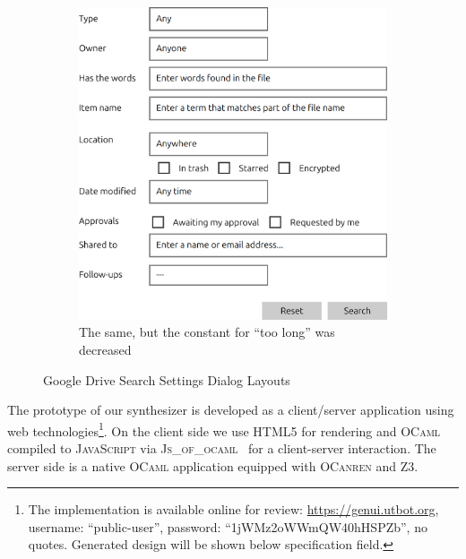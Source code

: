\begin{figure}[t]
\begin{subfigure}[t]{.45\textwidth}
    \end{subfigure}\hspace{1cm}
    \begin{subfigure}[t]{.45\textwidth}
      \centering
      \includegraphics[scale=0.25]{google-drive-search-setting-output3.png}
      \caption{The same, but the constant for ``too long'' was decreased}
    \end{subfigure}
    \caption{Google Drive Search Settings Dialog Layouts}
    \label{fig:QMLtwoGuidelines}
\end{figure}

\newcommand{\OCaml}{\textsc{OCaml}\xspace}
\newcommand{\OCanren}{\textsc{OCanren}\xspace}
\newcommand{\noCanren}{\textsc{noCanren}\xspace}
\newcommand{\Zthree}{\textsc{Z3}\xspace}
\newcommand{\JSOO}{\textsc{Js\_of\_ocaml}\xspace}


The prototype of our synthesizer is developed as a \mbox{client}/server application using web technologies\footnote{The implementation is available online
for review: \url{https://genui.utbot.org}, username: ``public-user'', password: ``1jWMz2oWWmQW40hHSPZb'', no quotes.
Generated design will be shown below specification field.}.
On the client side we use \textsc{HTML5} for rendering and \OCaml
compiled to \textsc{JavaScript} via \JSOO~\cite{JSOO} for a client-server interaction. The server side is a native \OCaml application equipped with \OCanren and \Zthree.

